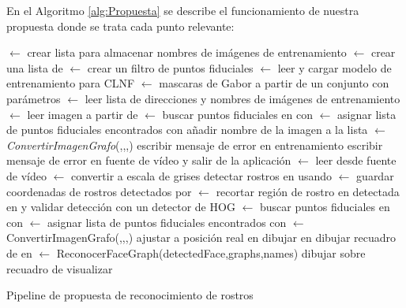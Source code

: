 En el Algoritmo \ref{alg:Propuesta} se describe el funcionamiento de nuestra propuesta donde se trata cada punto relevante:
\begin{algorithm}
 $\gets$ crear lista para almacenar nombres de imágenes de entrenamiento\;
 $\gets$ crear una lista de \;
 $\gets$ crear un filtro de puntos fiduciales\;
 $\gets$ leer y cargar modelo de entrenamiento para \ac{CLNF}\;
 $\gets$ mascaras de Gabor a partir de un conjunto con parámetros\;
 $\gets$ leer lista de direcciones y nombres de imágenes de entrenamiento\;
{
	 $\gets$ leer imagen a partir de \;
     $\gets$ buscar puntos fiduciales en  con \;
    {
    	 $\gets$ asignar lista de puntos fiduciales encontrados con \;
        añadir nombre de la imagen a la lista \;
        $\gets$\textit{ConvertirImagenGrafo}(,,,)\;
    }
    {
    	escribir mensaje de error en entrenamiento\;
    }
}
{
	escribir mensaje de error en fuente de vídeo y salir de la aplicación\;
}
{
	 $\gets$ leer desde fuente de vídeo\;
     $\gets$ convertir  a escala de grises\;
    detectar rostros en  usando \;
     $\gets$ guardar coordenadas de rostros detectados por \;
    {
    	 $\gets$ recortar región de rostro en detectada en  y validar detección con un detector de \ac{HOG}\;
         $\gets$ buscar puntos fiduciales en  con \;
    }
    {
    	 $\gets$ asignar lista de puntos fiduciales encontrados con \;
         $\gets$ ConvertirImagenGrafo(,,,)\;
    }
    ajustar  a posición real en \;
    dibujar  en \;
    dibujar recuadro de  en \;
     $\gets$ ReconocerFaceGraph(detectedFace,graphs,names)\;
    dibujar  sobre recuadro de \;
    visualizar \;
}
\caption{Pipeline de propuesta de reconocimiento de rostros}
\label{alg:Propuesta}
\end{algorithm}


